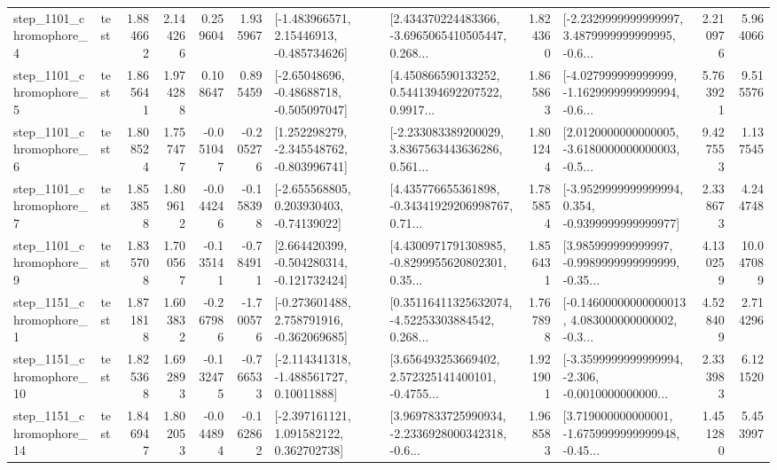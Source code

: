 \begin{tabular}{llrrrrllrlrr}
  step\_1101\_chromophore\_4 &      test &      1.884662 &    2.144266 &      0.259604 &  1.935967 &    [-1.483966571, 2.15446913, -0.485734626] &  [2.434370224483366, -3.6965065410505447, 0.268... &       1.824360 &  [-2.2329999999999997, 3.4879999999999995, -0.6... &            2.210976 &          5.964066 \\
  step\_1101\_chromophore\_5 &      test &      1.865641 &    1.974288 &      0.108647 &  0.895459 &    [-2.65048696, -0.48688718, -0.505097047] &  [4.450866590133252, 0.5441394692207522, 0.9917... &       1.865863 &  [-4.027999999999999, -1.1629999999999994, -0.6... &            5.763921 &          9.515576 \\
  step\_1101\_chromophore\_6 &      test &      1.808524 &    1.757477 &     -0.051047 & -0.205276 &   [1.252298279, -2.345548762, -0.803996741] &  [-2.233083389200029, 3.8367563443636286, 0.561... &       1.801244 &  [2.0120000000000005, -3.6180000000000003, -0.5... &            9.427553 &          1.137545 \\
  step\_1101\_chromophore\_7 &      test &      1.853858 &    1.809612 &     -0.044246 & -0.158398 &    [-2.655568805, 0.203930403, -0.74139022] &  [4.435776655361898, -0.34341929206998767, 0.71... &       1.785854 &  [-3.9529999999999994, 0.354, -0.9399999999999977] &            2.338673 &          4.244748 \\
  step\_1101\_chromophore\_9 &      test &      1.835708 &    1.700567 &     -0.135141 & -0.784911 &   [2.664420399, -0.504280314, -0.121732424] &  [4.4300971791308985, -0.8299955620802301, 0.35... &       1.856431 &  [3.985999999999997, -0.9989999999999999, -0.35... &            4.130259 &         10.047089 \\
  step\_1151\_chromophore\_1 &      test &      1.871818 &    1.603832 &     -0.267986 & -1.700576 &   [-0.273601488, 2.758791916, -0.362069685] &  [0.35116411325632074, -4.52253303884542, 0.268... &       1.767898 &  [-0.14600000000000013, 4.083000000000002, -0.3... &            4.528409 &          2.714296 \\
 step\_1151\_chromophore\_10 &      test &      1.825368 &    1.692893 &     -0.132475 & -0.766533 &    [-2.114341318, -1.488561727, 0.10011888] &  [3.656493253669402, 2.572325141400101, -0.4755... &       1.921901 &  [-3.3599999999999994, -2.306, -0.0010000000000... &            2.333983 &          6.121520 \\
 step\_1151\_chromophore\_14 &      test &      1.846947 &    1.802053 &     -0.044894 & -0.162862 &    [-2.397161121, 1.091582122, 0.362702738] &  [3.9697833725990934, -2.2336928000342318, -0.6... &       1.968583 &  [3.719000000000001, -1.6759999999999948, -0.45... &            1.451280 &          5.453997 \\

\end{tabular}
